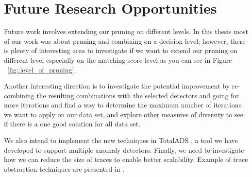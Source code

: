 \section{Future Research Opportunities}
\label{sec:future-research}

Future work involves extending our pruning on different levels. In this thesis most of our work was about pruning and combining on a decision level; however, there is plenty of interesting area to investigate if we want to extend our pruning on different level especially on the matching score level as you can see in Figure ~\ref{fig::level_of_pruning}.

Another interesting direction is to investigate the potential improvement by re-combining the resulting combinations with the selected detectors and going for more iterations and find a way to determine the maximum number of iterations we want to apply on our data set, and explore other measures of diversity to see if there is a one good solution for all data set.

We also intend to implement the new techniques in TotalADS \cite{Murtaza2014}, a tool we have developed to support multiple anomaly detectors. Finally, we need to investigate how we can reduce the size of traces to enable better scalability. Example of trace abstraction techniques are presented in \cite{Hamou-Lhadj2005,Murtaza2013}.